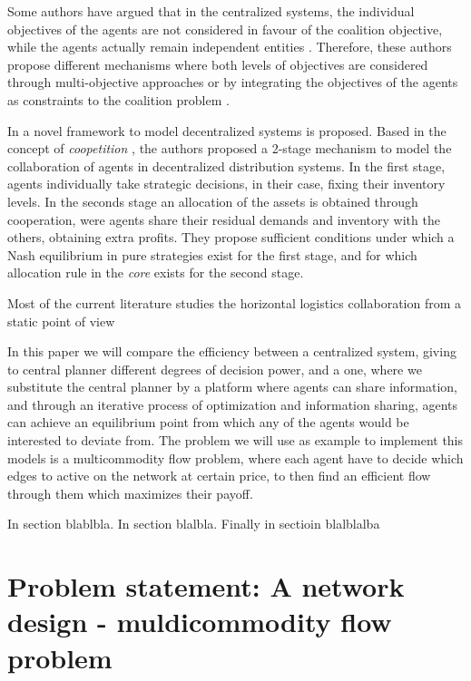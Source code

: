 \documentclass[review]{elsarticle}
\begin{document}
Some authors have argued that in the centralized systems, the individual
objectives of the agents are not considered in favour of the coalition
objective, while the agents actually remain independent entities
\cite{DEFRYN2018891}. Therefore, these authors propose different mechanisms where
both levels of objectives are considered through multi-objective approaches
\cite{DEFRYN20191} or by integrating the objectives of the agents as constraints
to the coalition problem \cite{VANOVERMEIRE2014125}.

In \cite{ANUPINDI2001} a novel framework to model decentralized systems is
proposed. Based in the concept of \emph{coopetition} \cite{BRANDENBURGER1996},
the authors proposed a 2-stage mechanism to model the collaboration of agents in
decentralized distribution systems. In the first stage, agents individually
take strategic decisions, in their case, fixing their inventory levels. In the
seconds stage an allocation of the assets is obtained through cooperation, were
agents share their residual demands and inventory with the others, obtaining
extra profits. They propose sufficient conditions under which a Nash equilibrium
in pure strategies exist for the first stage, and for which allocation rule in
the \emph{core} exists for the second stage.

Most of the current literature studies the  horizontal logistics collaboration from a static point of view \cite{BASSO2019}


In this paper we will compare the efficiency between a centralized system,
giving to central planner different degrees of decision power, and a
 one, where we substitute the central planner by a platform where
agents can share information, and through an iterative process of optimization
and information sharing, agents can achieve an equilibrium point from which any
of the agents would be interested to deviate from. The problem we
will use as example to implement this models is a multicommodity flow problem,
where each agent have to decide which edges to active on the network at certain
price, to then find an efficient flow through them which maximizes their
payoff.

In section blablbla. In section blalbla. Finally in sectioin blalblalba


\section{Problem statement: A network design - muldicommodity flow problem}\label{seq:probdefinition} 
\end{document}

